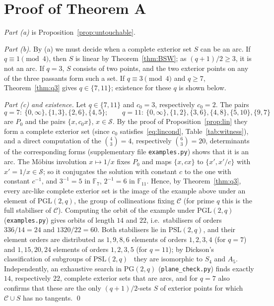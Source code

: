 \documentclass[11pt]{amsart}
\theoremstyle{definition}
\theoremstyle{remark}
\numberwithin{equation}{section}
\newcommand{\PGtwo}{\mathrm{PG}(2,q)}
\newcommand{\PGL}{\mathrm{PGL}(2,q)}
\newcommand{\PSL}{\mathrm{PSL}(2,q)}
\newcommand{\Sq}{\mathcal{S}}
\newcommand{\Con}{\mathcal{C}}
\begin{document}
\section{Proof of Theorem A}\label{sec:proof}

\emph{Part (a)} is Proposition~\ref{prop:untouchable}.

\emph{Part (b).} By (a) we must decide when a complete exterior set $S$ can be an arc. If $q\equiv1\pmod4$, then $S$ is linear by
Theorem~\ref{thm:BSW}; as $(q+1)/2\ge3$, it is not an arc. If $q=3$, $S$ consists of two points, and the two exterior points on any
of the three passants form such a set. If $q\equiv3\pmod 4$ and $q\ge7$, Theorem~\ref{thm:q3} gives $q\in\{7,11\}$; existence for
these $q$ is shown below.

\emph{Part (c) and existence.} Let $q\in\{7,11\}$ and $c_0=3$, respectively $c_0=2$. The pairs
\[
q=7:\ \{0,\infty\},\{1,3\},\{2,6\},\{4,5\};\qquad
q=11:\ \{0,\infty\},\{1,2\},\{3,6\},\{4,8\},\{5,10\},\{9,7\}
\]
are $P_0$ and the pairs $\{x,c_0x\}$, $x\in\Sq$. By the proof of Proposition~\ref{prop:lin} they form a complete exterior set (since
$c_0$ satisfies~\eqref{eq:lincond}, Table~\ref{tab:witness}), and a direct computation of the $\binom43=4$, respectively
$\binom63=20$, determinants of the corresponding forms (supplementary file \texttt{examples.py}) shows that it is an arc. The
Möbius involution $x\mapsto1/x$ fixes $P_0$ and maps $\{x,cx\}$ to $\{x',x'/c\}$ with $x'=1/x\in\Sq$; so it conjugates the solution
with constant $c$ to the one with constant $c^{-1}$, and $3^{-1}=5$ in $\mathbb F_7$, $2^{-1}=6$ in $\mathbb F_{11}$. Hence, by
Theorem~\ref{thm:q3}, every arc-like complete exterior set is the image of the example above under an element of $\PGL$, the group of
collineations fixing $\Con$ (for prime $q$ this is the full stabiliser of $\Con$). Computing the orbit of the example under $\PGL$
(\texttt{examples.py}) gives orbits of length $14$ and $22$, i.e.\ stabilisers of orders $336/14=24$ and $1320/22=60$. Both
stabilisers lie in $\PSL$, and their element orders are distributed as $1,9,8,6$ elements of orders $1,2,3,4$ (for $q=7$) and
$1,15,20,24$ elements of orders $1,2,3,5$ (for $q=11$); by Dickson's classification of subgroups of $\PSL$~\cite[Hauptsatz~II.8.27]{Huppert} they are
isomorphic to $S_4$ and $A_5$. Independently, an exhaustive search in $\PGtwo$ (\texttt{plane\_check.py}) finds exactly $14$, respectively $22$, complete
exterior sets that are arcs, and for $q=7$ also confirms that these are the only $(q+1)/2$-sets $S$ of exterior points for which
$\Con\cup S$ has no tangents. \qed
\end{document}
